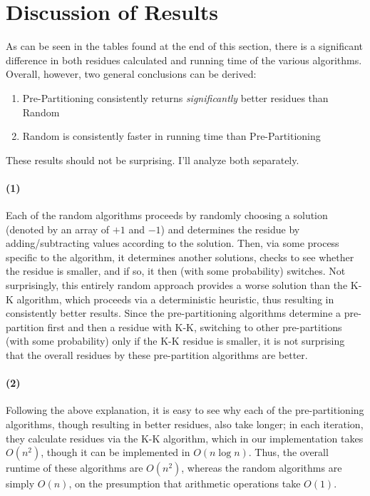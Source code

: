 \documentclass[12pt]{article}
\begin{document}
\section{Discussion of Results}
As can be seen in the tables found at the end of this section, there is a significant difference in both residues calculated and running time of the various algorithms. Overall, however, two general conclusions can be derived:
\begin{enumerate}
\item Pre-Partitioning consistently returns \textit{significantly} better residues than Random
\item Random is consistently faster in running time than Pre-Partitioning
\end{enumerate}
These results should not be surprising. I'll analyze both separately.

\paragraph{(1)} Each of the random algorithms proceeds by randomly choosing a solution (denoted by an array of $+1$ and $-1$) and determines the residue by adding/subtracting values according to the solution. Then, via some process specific to the algorithm, it determines another solutions, checks to see whether the residue is smaller, and if so, it then (with some probability) switches. Not surprisingly, this entirely random approach provides a worse solution than the K-K algorithm, which proceeds via a deterministic heuristic, thus resulting in consistently better results. Since the pre-partitioning algorithms determine a pre-partition first and then a residue with K-K, switching to other pre-partitions (with some probability) only if the K-K residue is smaller, it is not surprising that the overall residues by these pre-partition algorithms are better.

\paragraph{(2)} Following the above explanation, it is easy to see why each of the pre-partitioning algorithms, though resulting in better residues, also take longer; in each iteration, they calculate residues via the K-K algorithm, which in our implementation takes $O(n^2)$, though it can be implemented in $O(n \log{n})$. Thus, the overall runtime of these algorithms are $O(n^2)$, whereas the random algorithms are simply $O(n)$, on the presumption that arithmetic operations take $O(1)$.\\
\end{document}
